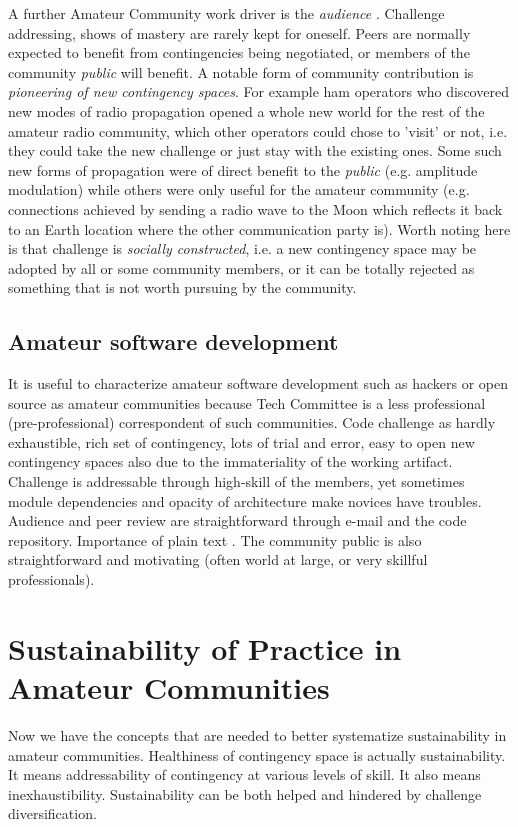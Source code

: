 \documentclass{acm_proc_article-sp}
\begin{document}
A further Amateur Community work driver is the \textit{audience} \cite{bogdan03}. Challenge addressing, shows of mastery are rarely kept for oneself. %
Peers are normally expected to benefit from contingencies being negotiated, or members of the community \textit{public} will benefit. A notable form of community contribution is \textit{pioneering of new contingency spaces}.  For example ham operators who discovered new modes of radio propagation opened a whole new world for the rest of the amateur radio community, which other operators could chose to 'visit' or not, i.e. they could take the new challenge or just stay with the existing ones. Some such new forms of propagation were of direct benefit to the \textit{public}  (e.g. amplitude modulation) while others were only useful for the amateur community (e.g. connections achieved by sending a radio wave to the Moon which reflects it back to an Earth location where the other communication party is). Worth noting here is that challenge is \textit{socially constructed}, i.e. a new contingency space may be adopted by all or some community members, or it can be totally rejected as something that is not worth pursuing by the community.

\subsection{Amateur software development}\label{sec:amateur_devel}
It is useful to characterize amateur software development such as hackers \cite{levy94} or open source \cite{kollock99} as amateur communities 
because Tech Committee is a less professional (pre-professional) correspondent of such communities. 
Code challenge as hardly exhaustible, rich set of contingency, lots of trial and error, easy to open new contingency spaces also due to the immateriality of the working artifact. 
Challenge is addressable through high-skill of the members, yet sometimes module dependencies and opacity of architecture make novices have troubles. 
Audience and peer review are straightforward through e-mail and the code repository. Importance of plain text \cite{yamauchi00}. 
The community public is also straightforward and motivating (often world at large, or very skillful professionals).

\section{Sustainability of Practice in Amateur Communities}\label{sec:sust}
Now we have the concepts that are needed to better systematize sustainability in amateur communities.
Healthiness of  contingency space is actually sustainability. 
It means addressability of contingency at various levels of skill.
It also means inexhaustibility.
Sustainability can be both helped and hindered by challenge diversification.
\end{document}
